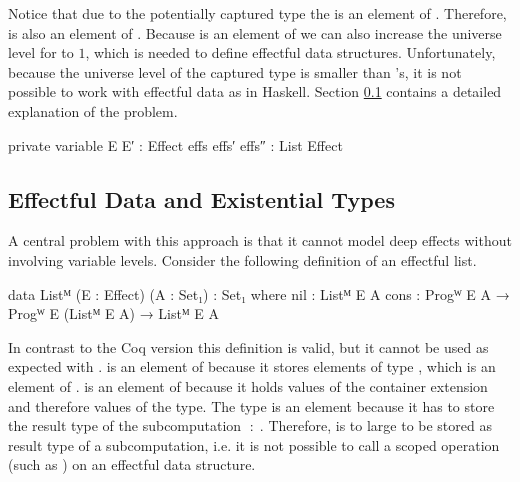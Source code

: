 Notice that due to the potentially captured type the  is an
element of .
Therefore,  is also an element of .
Because  is an element of  we can also
increase the universe level for  to $1$, which is needed to
define effectful data structures.
Unfortunately, because the universe level of the captured type is smaller than
's, it is not possible to work with effectful data as in
Haskell.
Section \ref{higher-order:eff-data-ext-types} contains a detailed explanation of
the problem.

\begin{code}[hide]
private
  variable
    E E′ : Effect
    effs effs′ effs″ : List Effect
\end{code}

\subsection{Effectful Data and Existential Types}
\label{higher-order:eff-data-ext-types}

A central problem with this approach is that it cannot model deep effects
without involving variable levels.
Consider the following definition of an effectful list.

\begin{code}
data Listᴹ (E : Effect) (A : Set₁) : Set₁ where
  nil   : Listᴹ E A
  cons  : Progᵂ E A → Progᵂ E (Listᴹ E A) → Listᴹ E A
\end{code}
In contrast to the Coq version this definition is valid, but it cannot be used
as expected with .
\AgdaSpace{}\AgdaSpace{} is
an element of  because it stores elements of type
\AgdaSpace{}\AgdaSpace{},
which is an element of .
\AgdaSpace{}\AgdaSpace{} is
an element of  because it holds values of the container
extension and therefore values of the  type.
The  type is an element  because it has to
store the result type of the subcomputation
$\;:\;$.
Therefore,
\AgdaSpace{}\AgdaSpace{} is
to large to be stored as result type of a subcomputation, i.e. it is not possible
to call a scoped operation (such as ) on an effectful data
structure.

